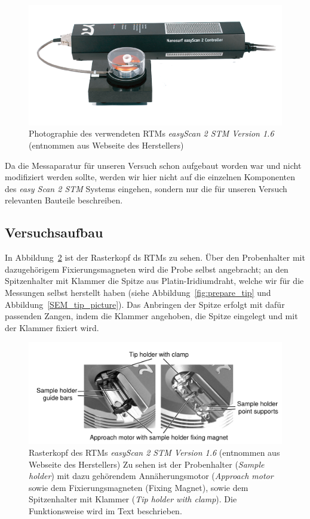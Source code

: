 \begin{figure}
\includegraphics[width=14cm]{pics/stm1}
\caption{Photographie des verwendeten RTMs \textit{easyScan 2
STM Version 1.6} (entnommen aus Webseite des Herstellers)} 
 \label{fig:stm1}
\end{figure}

Da die Messaparatur für unseren Versuch schon aufgebaut worden
war und nicht modifiziert werden sollte, werden wir hier nicht
auf die einzelnen Komponenten des \textit{easy Scan 2 STM} Systems
eingehen, sondern nur die für unseren Versuch relevanten 
Bauteile beschreiben.
\subsection{Versuchsaufbau}
In Abbildung~\ref{fig:Rasterkopf} ist der Rasterkopf ds RTMs zu
sehen. Über den Probenhalter mit dazugehörigem Fixierungsmagneten
wird die Probe selbst angebracht; an den Spitzenhalter mit
Klammer die Spitze aus Platin-Iridiumdraht, 
welche wir für die Messungen selbst herstellt haben (siehe
Abbildung~\ref{fig:prepare_tip} und Abbildung~\ref{SEM_tip_picture}).
Das Anbringen der Spitze erfolgt mit dafür passenden Zangen,
indem die Klammer angehoben, die Spitze eingelegt und mit
der Klammer fixiert wird.

\begin{figure}
\includegraphics[width=14cm]{pics/rasterkopf}
\caption{Rasterkopf des RTMs \textit{easyScan 2
STM Version 1.6} (entnommen aus Webseite des Herstellers)
Zu sehen ist der Probenhalter (\textit{Sample holder}) mit dazu
gehörendem Annäherungsmotor (\textit{Approach motor} sowie
dem Fixierungsmagneten ({Fixing Magnet}), sowie dem Spitzenhalter
mit Klammer (\textit{Tip holder with clamp}). Die Funktionsweise
wird im Text beschrieben.}
 \label{fig:Rasterkopf}
\end{figure}

